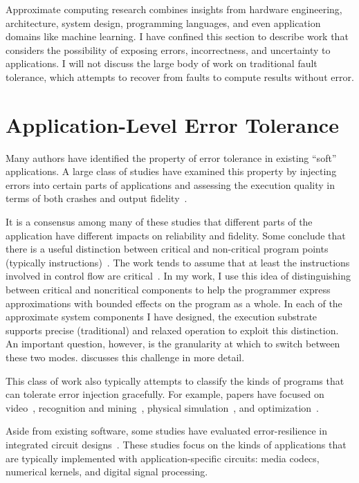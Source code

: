 Approximate computing research combines insights from hardware engineering,
architecture, system design, programming languages, and even application
domains like machine learning. I have confined this section to describe work
that considers the possibility of exposing errors, incorrectness, and
uncertainty to applications. I will not discuss the large body of work on
traditional fault tolerance, which attempts to recover from faults to compute
results without error.

\section{Application-Level Error Tolerance}
\label{sec:related:studies}

Many authors have identified the property of error tolerance in existing
``soft''
applications. A large class of studies have examined this property by
injecting errors into certain parts of applications and assessing the
execution quality in terms of both crashes and output fidelity~\cite{li06,
li07, li08, dekruijf-selse09, wong-selse06, palem-arcs, freton, besteffort,
yeh, thaker-iiswc06, efc, llfi, chippa-dac}.

It is a consensus among many of these studies that different parts of the
application have different impacts on reliability and fidelity. Some conclude
that there is a useful distinction between critical and non-critical program
points (typically instructions)~\cite{palem-arcs, thaker-iiswc06, flikker,
llfi}.
The work tends to assume that at least the instructions involved in control
flow are critical~\cite{thaker-iiswc06}. In my work, I use this idea of
distinguishing between critical and noncritical components to help the
programmer express approximations with bounded effects on the program as a
whole. In each of the approximate system components I have designed, the
execution substrate supports precise (traditional) and relaxed operation to
exploit this distinction. An important question, however, is the granularity
at which to switch between these two modes.  discusses
this challenge in more detail.

This class of work also typically attempts to classify the kinds of programs
that can tolerate error injection gracefully. For example, papers have focused
on video~\cite{freton}, recognition and mining~\cite{besteffort}, physical
simulation~\cite{yeh}, and optimization~\cite{hogwild}.

Aside from existing software, some studies have evaluated error-resilience in
integrated circuit designs~\cite{breuer, scalable-effort-hardware}. These
studies focus on the kinds of applications that are typically implemented with
application-specific circuits: media codecs, numerical kernels, and digital
signal processing.

